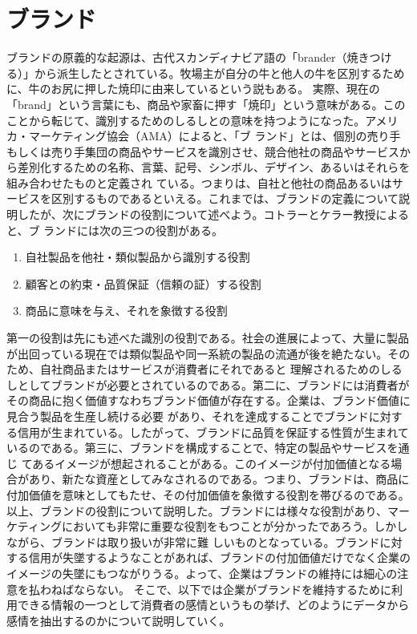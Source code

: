 \documentclass[uplatex,11pt]{jsarticle}
\begin{document}
\section{ブランド}
ブランドの原義的な起源は、古代スカンディナビア語の「brander（焼きつける）」から派生したとされている。牧場主が自分の牛と他人の牛を区別するために、牛のお尻に押した焼印に由来しているという説もある。
実際、現在の「brand」という言葉にも、商品や家畜に押す「焼印」という意味がある。このことから転じて、識別するためのしるしとの意味を持つようになった。アメリカ・マーケティング協会（AMA）によると、「ブ
ランド」とは、個別の売り手もしくは売り手集団の商品やサービスを識別させ、競合他社の商品やサービスから差別化するための名称、言葉、記号、シンボル、デザイン、あるいはそれらを組み合わせたものと定義され
ている。つまりは、自社と他社の商品あるいはサービスを区別するものであるといえる。これまでは、ブランドの定義について説明したが、次にブランドの役割について述べよう。コトラーとケラー教授\cite{コトラー}によると、ブ
ランドには次の三つの役割がある。
\begin{enumerate}
    \item 自社製品を他社・類似製品から識別する役割
    \item 顧客との約束・品質保証（信頼の証）する役割
    \item 商品に意味を与え、それを象徴する役割
\end{enumerate}
第一の役割は先にも述べた識別の役割である。社会の進展によって、大量に製品が出回っている現在では類似製品や同一系統の製品の流通が後を絶たない。そのため、自社商品またはサービスが消費者にそれであると
理解されるためのしるしとしてブランドが必要とされているのである。第二に、ブランドには消費者がその商品に抱く価値すなわちブランド価値が存在する。企業は、ブランド価値に見合う製品を生産し続ける必要
があり、それを達成することでブランドに対する信用が生まれている。したがって、ブランドに品質を保証する性質が生まれているのである。第三に、ブランドを構成することで、特定の製品やサービスを通じ
てあるイメージが想起されることがある。このイメージが付加価値となる場合があり、新たな資産としてみなされるのである。つまり、ブランドは、商品に付加価値を意味としてもたせ、その付加価値を象徴する役割を帯びるのである。\\
以上、ブランドの役割について説明した。ブランドには様々な役割があり、マーケティングにおいても非常に重要な役割をもつことが分かったであろう。しかしながら、ブランドは取り扱いが非常に難
しいものとなっている。ブランドに対する信用が失墜するようなことがあれば、ブランドの付加価値だけでなく企業のイメージの失墜にもつながりうる。よって、企業はブランドの維持には細心の注意を払わねばならない。
そこで、以下では企業がブランドを維持するために利用できる情報の一つとして消費者の感情というもの挙げ、どのようにデータから感情を抽出するのかについて説明していく。
\end{document}
